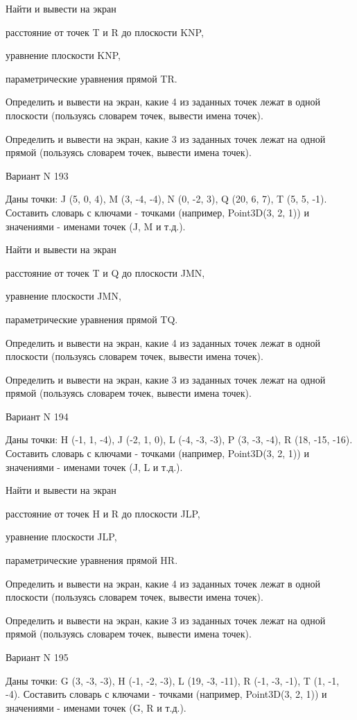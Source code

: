 \documentclass[11pt]{report}
\begin{document}
Найти и вывести на экран


расстояние от точек T и R до плоскости KNP,


уравнение плоскости KNP,


параметрические уравнения прямой TR.


Определить и вывести на экран, какие 4 из заданных точек лежат в одной плоскости (пользуясь словарем точек, вывести имена точек).


Определить и вывести на экран, какие 3 из заданных точек лежат на одной прямой (пользуясь словарем точек, вывести имена точек).

\newpage
Вариант N 193

Даны точки: J (5, 0, 4), M (3, -4, -4), N (0, -2, 3), Q (20, 6, 7), T (5, 5, -1).
Составить словарь с ключами - точками (например, Point3D(3, 2, 1)) и значениями - именами точек (J, M и т.д.).


Найти и вывести на экран


расстояние от точек T и Q до плоскости JMN,


уравнение плоскости JMN,


параметрические уравнения прямой TQ.


Определить и вывести на экран, какие 4 из заданных точек лежат в одной плоскости (пользуясь словарем точек, вывести имена точек).


Определить и вывести на экран, какие 3 из заданных точек лежат на одной прямой (пользуясь словарем точек, вывести имена точек).

\newpage
Вариант N 194

Даны точки: H (-1, 1, -4), J (-2, 1, 0), L (-4, -3, -3), P (3, -3, -4), R (18, -15, -16).
Составить словарь с ключами - точками (например, Point3D(3, 2, 1)) и значениями - именами точек (J, L и т.д.).


Найти и вывести на экран


расстояние от точек H и R до плоскости JLP,


уравнение плоскости JLP,


параметрические уравнения прямой HR.


Определить и вывести на экран, какие 4 из заданных точек лежат в одной плоскости (пользуясь словарем точек, вывести имена точек).


Определить и вывести на экран, какие 3 из заданных точек лежат на одной прямой (пользуясь словарем точек, вывести имена точек).

\newpage
Вариант N 195

Даны точки: G (3, -3, -3), H (-1, -2, -3), L (19, -3, -11), R (-1, -3, -1), T (1, -1, -4).
Составить словарь с ключами - точками (например, Point3D(3, 2, 1)) и значениями - именами точек (G, R и т.д.).
\end{document}
